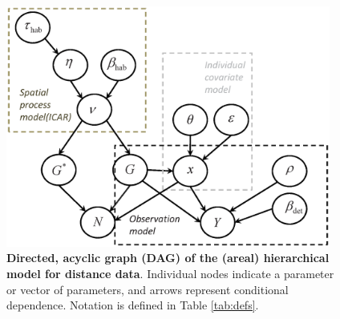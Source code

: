 \documentclass[10pt]{article}
\begin{document}

\begin{figure}
\begin{center}
\includegraphics[width=0.95\textwidth]{DAG.eps}
\end{center}
\caption{{\bf Directed, acyclic graph (DAG) of the (areal) hierarchical model
for distance data}. Individual nodes indicate a parameter or vector of parameters, and arrows represent conditional dependence. Notation is defined in Table \ref{tab:defs}.}
\label{fig:DAG}
\end{figure}
\clearpage
\end{document}
